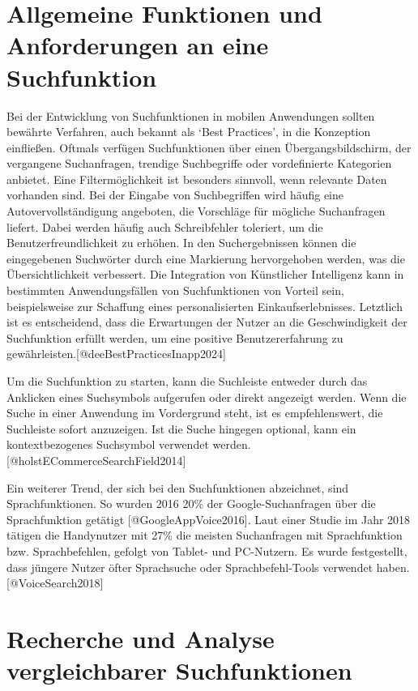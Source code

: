 \documentclass[
  12pt,
  a4paperpaper,
]{report}
\begin{document}
\section{Allgemeine Funktionen und Anforderungen an eine
Suchfunktion}\label{allgemeine-funktionen-und-anforderungen-an-eine-suchfunktion}

Bei der Entwicklung von Suchfunktionen in mobilen Anwendungen sollten
bewährte Verfahren, auch bekannt als `Best Practices', in die Konzeption
einfließen. Oftmals verfügen Suchfunktionen über einen
Übergangsbildschirm, der vergangene Suchanfragen, trendige Suchbegriffe
oder vordefinierte Kategorien anbietet. Eine Filtermöglichkeit ist
besonders sinnvoll, wenn relevante Daten vorhanden sind. Bei der Eingabe
von Suchbegriffen wird häufig eine Autovervollständigung angeboten, die
Vorschläge für mögliche Suchanfragen liefert. Dabei werden häufig auch
Schreibfehler toleriert, um die Benutzerfreundlichkeit zu erhöhen. In
den Suchergebnissen können die eingegebenen Suchwörter durch eine
Markierung hervorgehoben werden, was die Übersichtlichkeit verbessert.
Die Integration von Künstlicher Intelligenz kann in bestimmten
Anwendungsfällen von Suchfunktionen von Vorteil sein, beispielsweise zur
Schaffung eines personalisierten Einkaufserlebnisses. Letztlich ist es
entscheidend, dass die Erwartungen der Nutzer an die Geschwindigkeit der
Suchfunktion erfüllt werden, um eine positive Benutzererfahrung zu
gewährleisten.{[}@deeBestPracticesInapp2024{]}

Um die Suchfunktion zu starten, kann die Suchleiste entweder durch das
Anklicken eines Suchsymbols aufgerufen oder direkt angezeigt werden.
Wenn die Suche in einer Anwendung im Vordergrund steht, ist es
empfehlenswert, die Suchleiste sofort anzuzeigen. Ist die Suche hingegen
optional, kann ein kontextbezogenes Suchsymbol verwendet werden.
{[}@holstECommerceSearchField2014{]}

Ein weiterer Trend, der sich bei den Suchfunktionen abzeichnet, sind
Sprachfunktionen. So wurden 2016 20\thinspace\% der Google-Suchanfragen
über die Sprachfunktion getätigt {[}@GoogleAppVoice2016{]}. Laut einer
Studie im Jahr 2018 tätigen die Handynutzer mit 27\thinspace\% die
meisten Suchanfragen mit Sprachfunktion bzw. Sprachbefehlen, gefolgt von
Tablet- und PC-Nutzern. Es wurde festgestellt, dass jüngere Nutzer öfter
Sprachsuche oder Sprachbefehl-Tools verwendet haben.
{[}@VoiceSearch2018{]}

\section{Recherche und Analyse vergleichbarer
Suchfunktionen}\label{recherche-und-analyse-vergleichbarer-suchfunktionen}
\end{document}
